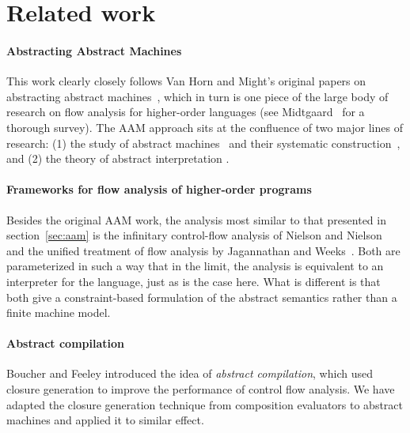 \documentclass[preprint,onecolumn,9pt]{sigplanconf} %
\begin{document}
\section{Related work}
\label{sec:related}

\paragraph{Abstracting Abstract Machines}

This work clearly closely follows Van Horn and Might's original papers
on abstracting abstract
machines~\cite{dvanhorn:VanHorn2011Abstracting,dvanhorn:VanHorn2012Systematic},
which in turn is one piece of the large body of research on flow
analysis for higher-order languages (see
Midtgaard~\cite{dvanhorn:Midtgaard2011Controlflow} for a thorough
survey).  The AAM approach sits at the confluence of two major lines
of research: (1) the study of abstract
machines~\cite{dvanhorn:landin-64} and their systematic
construction~\cite{dvanhorn:reynolds-hosc98}, and (2) the theory of
abstract interpretation
\cite{dvanhorn:Cousot:1977:AI,dvanhorn:Cousot1979Systematic}.


\paragraph{Frameworks for flow analysis of higher-order programs}

Besides the original AAM work, the analysis most similar to that
presented in section~\ref{sec:aam} is the infinitary control-flow
analysis of Nielson and Nielson~\cite{dvanhorn:nielson-nielson-popl97}
and the unified treatment of flow analysis by Jagannathan and
Weeks~\cite{dvanhorn:jagannathan-weeks-popl95}.  Both are
parameterized in such a way that in the limit, the analysis is
equivalent to an interpreter for the language, just as is the case
here.  What is different is that both give a constraint-based
formulation of the abstract semantics rather than a finite machine
model.

\paragraph{Abstract compilation}

Boucher and Feeley \cite{dvanhorn:Boucher1996Abstract} introduced the
idea of \emph{abstract compilation}, which used closure generation
\cite{dvanhorn:Feeley1987Using} to improve the performance of control
flow analysis.  We have adapted the closure generation technique from
composition evaluators to abstract machines and applied it to similar
effect.
\end{document}
